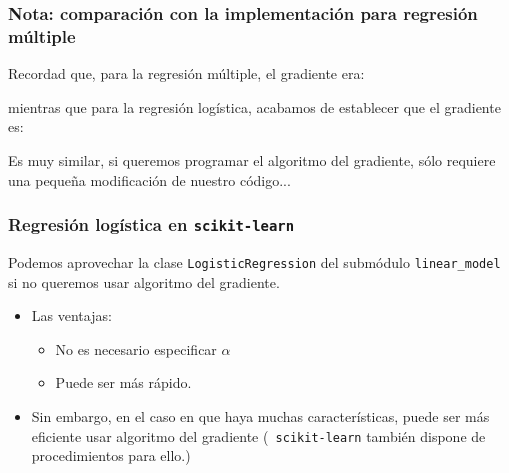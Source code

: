 \documentclass{beamer}
\begin{document}
\begin{frame}\frametitle{Nota: comparación con la implementación para regresión múltiple}
Recordad que, para la regresión múltiple, el gradiente era:

   \begin{center}
    \end{center}
mientras que para la regresión logística, acabamos de establecer que
el gradiente  es:
   \begin{center}
    \end{center}
Es muy similar, si queremos programar el algoritmo del gradiente, sólo requiere una pequeña modificación de nuestro código...
\end{frame}
\begin{frame}\frametitle{Regresión logística en {\tt scikit-learn}}
  \begin{block}{}
     Podemos aprovechar la clase {\tt LogisticRegression} del
     submódulo {\tt linear\_model} si no queremos usar algoritmo del gradiente.
  \end{block}
  \begin{itemize}
  \item  Las ventajas:
 \begin{itemize}
 \item No es necesario especificar $\alpha$
 \item Puede ser más rápido.
 \end{itemize}
\item<3-> Sin embargo, en el caso en que haya muchas características,
  puede ser más eficiente usar algoritmo del gradiente ({\tt
    scikit-learn} también dispone de procedimientos para ello.)
  \end{itemize}
\end{frame}
\end{document}
